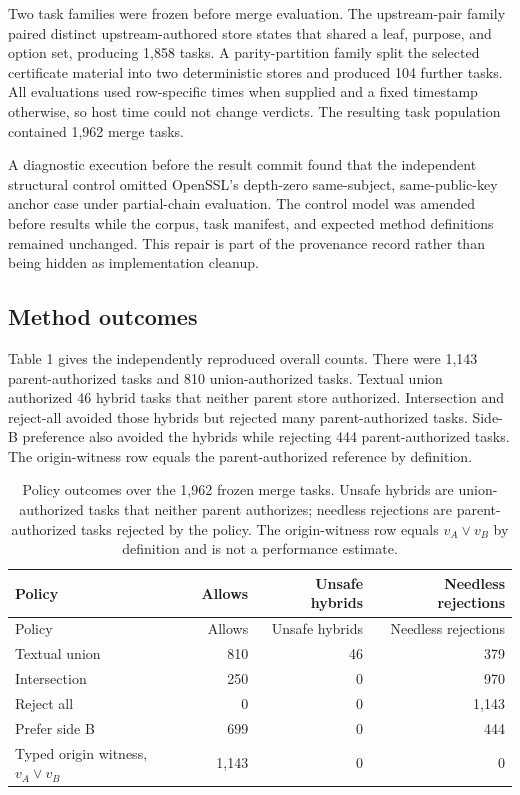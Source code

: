 \documentclass[pdflatex,sn-mathphys-num]{sn-jnl}
\begin{document}
Two task families were frozen before merge evaluation. The upstream-pair family paired distinct upstream-authored store states that shared a leaf, purpose, and option set, producing 1,858 tasks. A parity-partition family split the selected certificate material into two deterministic stores and produced 104 further tasks. All evaluations used row-specific times when supplied and a fixed timestamp otherwise, so host time could not change verdicts. The resulting task population contained 1,962 merge tasks.

A diagnostic execution before the result commit found that the independent structural control omitted OpenSSL's depth-zero same-subject, same-public-key anchor case under partial-chain evaluation. The control model was amended before results while the corpus, task manifest, and expected method definitions remained unchanged. This repair is part of the provenance record rather than being hidden as implementation cleanup.

\subsection{Method outcomes}\label{method-outcomes}

Table 1 gives the independently reproduced overall counts. There were 1,143 parent-authorized tasks and 810 union-authorized tasks. Textual union authorized 46 hybrid tasks that neither parent store authorized. Intersection and reject-all avoided those hybrids but rejected many parent-authorized tasks. Side-B preference also avoided the hybrids while rejecting 444 parent-authorized tasks. The origin-witness row equals the parent-authorized reference by definition.

\begin{longtable}[]{@{}lrrr@{}}
\caption{Policy outcomes over the 1,962 frozen merge tasks. Unsafe hybrids are union-authorized tasks that neither parent authorizes; needless rejections are parent-authorized tasks rejected by the policy. The origin-witness row equals \(v_A\lor v_B\) by definition and is not a performance estimate.}\tabularnewline
\toprule\noalign{}
Policy & Allows & Unsafe hybrids & Needless rejections \\
\midrule\noalign{}
\endfirsthead
\toprule\noalign{}
Policy & Allows & Unsafe hybrids & Needless rejections \\
\midrule\noalign{}
\endhead
\bottomrule\noalign{}
\endlastfoot
Textual union & 810 & 46 & 379 \\
Intersection & 250 & 0 & 970 \\
Reject all & 0 & 0 & 1,143 \\
Prefer side B & 699 & 0 & 444 \\
Typed origin witness, \(v_A\lor v_B\) & 1,143 & 0 & 0 \\
\end{longtable}
\end{document}

